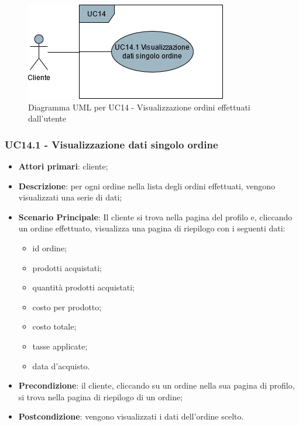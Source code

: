 \begin{figure}[H]
\centering
\includegraphics[scale=0.6]{res/UseCase/Immagini/VisualizzazioneOrdini}
\caption{Diagramma UML per UC14 - Visualizzazione ordini effettuati dall'utente}
\end{figure}

\subsubsection{UC14.1 - Visualizzazione dati singolo ordine}
\begin{itemize}
\item \textbf{Attori primari}: cliente;
\item \textbf{Descrizione}: per ogni ordine nella lista degli ordini effettuati, vengono visualizzati una serie di dati;
\item \textbf{Scenario Principale}: Il cliente si trova nella pagina del profilo e, cliccando un ordine effettuato, visualizza  una pagina di riepilogo con i seguenti dati:
\begin{itemize}
\item id ordine;
\item prodotti acquistati;
\item quantità prodotti acquistati;
\item costo per prodotto;
\item costo totale;
\item tasse applicate;
\item data d'acquisto.
\end{itemize}
\item \textbf{Precondizione}: il cliente, cliccando su un ordine nella sua pagina di profilo, si trova nella pagina di riepilogo di un ordine;
\item \textbf{Postcondizione}: vengono visualizzati i dati dell'ordine scelto.
\end{itemize}

